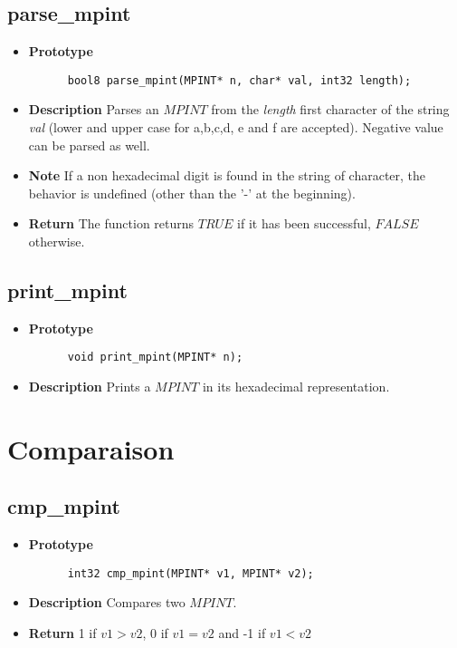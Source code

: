 \documentclass[10pt,a4paper]{article}
\begin{document}
  \subsection{parse\_mpint}
  
  \begin{itemize}
    \item [] \textbf{Prototype}
    \begin{lstlisting}
      bool8 parse_mpint(MPINT* n, char* val, int32 length);
    \end{lstlisting}
    \item [] \textbf{Description} Parses an $MPINT$ from the \textit{length} first character of the string \textit{val} (lower and upper case for a,b,c,d, e and f are accepted). Negative value can be
    parsed as well.
    \item [] \textbf{Note} If a non hexadecimal digit is found in the string of character, the behavior is undefined (other than the '-' at the beginning).
    \item [] \textbf{Return} The function returns $TRUE$ if it has been successful, $FALSE$ otherwise.
    
  \end{itemize}
  
  \subsection{print\_mpint}
  
  \begin{itemize}
    \item [] \textbf{Prototype}
    \begin{lstlisting}
      void print_mpint(MPINT* n);
    \end{lstlisting}
    \item [] \textbf{Description} Prints a $MPINT$ in its hexadecimal representation.
  \end{itemize}
  
  \section{Comparaison}
  
  \subsection{cmp\_mpint}
  
  \begin{itemize}
    \item [] \textbf{Prototype}
    \begin{lstlisting}
      int32 cmp_mpint(MPINT* v1, MPINT* v2);
    \end{lstlisting}
    \item [] \textbf{Description} Compares two $MPINT$.
    \item [] \textbf{Return} 1 if $v1 > v2$, 0 if $v1 = v2$ and -1 if $v1 < v2$
    
  \end{itemize}
  
\end{document}
